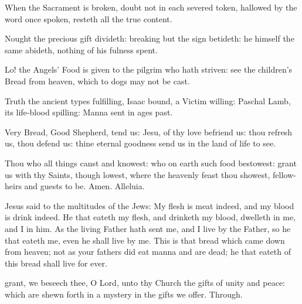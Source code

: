When the Sacrament is broken, doubt not in each severed token, hallowed by the word once spoken, resteth all the true content.\par
Nought the precious gift divideth: breaking but the sign betideth: he himself the same abideth, nothing of his fulness spent.\par
Lo! the Angels' Food is given to the pilgrim who hath striven: see the children's Bread from heaven, which to dogs may not be cast.\par
Truth the ancient types fulfilling, Isaac bound, a Victim willing: Paschal Lamb, its life-blood spilling: Manna sent in ages past.\par
Very Bread, Good Shepherd, tend us: Jesu, of thy love befriend us: thou refresh us, thou defend us: thine eternal goodness send us in the land of life to see.\par
Thou who all things canst and knowest: who on earth such food bestowest: grant us with thy Saints, though lowest, where the heavenly feast thou showest, fellow-heirs and guests to be. Amen. Alleluia.


\clearpage
{}
 Jesus said to the multitudes of the Jews: My flesh is meat indeed, and my blood is drink indeed. He that eateth my flesh, and drinketh my blood, dwelleth in me, and I in him. As the living Father hath sent me, and I live by the Father, so he that eateth me, even he shall live by me. This is that bread which came down from heaven; not as your fathers did eat manna and are dead; he that eateth of this bread shall live for ever.

\vspace{-0.25\baselineskip}

\secret
{} grant, we beseech thee, O Lord, unto thy Church the gifts of unity and peace: which are shewn forth in a mystery in the gifts we offer. Through.

\vspace{-0.25\baselineskip}

